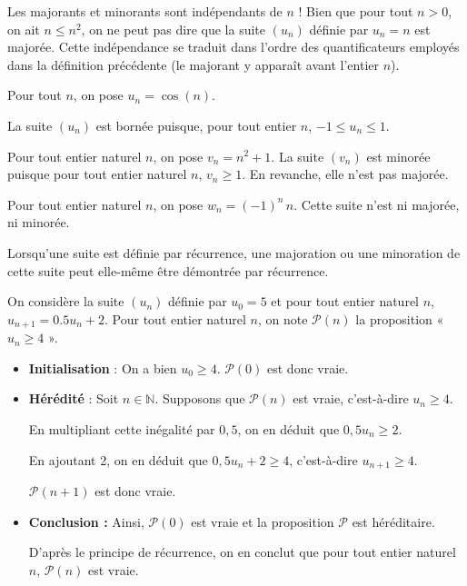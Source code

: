 \documentclass[11pt,fleqn]{book} %
\begin{document}
Les majorants et minorants sont indépendants de $n$ ! Bien que pour tout $n>0$, on ait $n \leqslant n^2$, on ne peut pas dire que la suite $(u_n)$ définie par $u_n=n$ est majorée. Cette indépendance se traduit dans l'ordre des quantificateurs employés dans la définition précédente (le majorant y apparaît avant l'entier $n$).


\begin{example}Pour tout $n$, on pose $u_n=\cos (n)$. 

La suite $(u_n)$ est bornée puisque, pour tout entier $n$, $-1 \leqslant u_n \leqslant 1$.\end{example}

\begin{example} Pour tout entier naturel $n$, on pose $v_n=n^2+1$. La suite $(v_n)$ est minorée puisque pour tout entier naturel $n$, $v_n\geqslant 1$. En revanche, elle n'est pas majorée. \end{example}

\begin{example} Pour tout entier naturel $n$, on pose $w_n=(-1)^n \, n$. Cette suite n'est ni majorée, ni minorée.\end{example}

Lorsqu'une suite est définie par récurrence, une majoration ou une minoration de cette suite peut elle-même être démontrée par récurrence.

\begin{example} On considère la suite $(u_n)$ définie par $u_0 = 5$ et pour tout entier naturel $n$, $u_{n+1}=0.5u_n + 2$. Pour tout entier naturel $n$, on note $\mathcal{P}(n)$ la proposition « $u_n \geqslant 4$ ».
\begin{itemize}
\item \textbf{Initialisation} : On a bien $u_0 \geqslant 4$. $\mathcal{P}(0)$ est donc vraie.
\vskip5pt
\item \textbf{Hérédité} : Soit $n\in\mathbb{N}$. Supposons que $\mathcal{P}(n)$ est vraie, c'est-à-dire $u_n \geqslant 4$. 

En multipliant cette inégalité par $0,5$, on en déduit que $0,5 u_n \geqslant 2$. 

En ajoutant 2, on en déduit que $0,5u_n+2 \geqslant 4$, c'est-à-dire $u_{n+1}\geqslant 4$. 

$\mathcal{P}(n+1)$ est donc vraie.
\vskip5pt
\item \textbf{Conclusion :} Ainsi, $\mathcal{P}(0)$ est vraie et la proposition $\mathcal{P}$ est héréditaire. 

D'après le principe de récurrence, on en conclut que pour tout entier naturel $n$, $\mathcal{P}(n)$ est vraie.
\end{itemize}\end{example}
\end{document}
